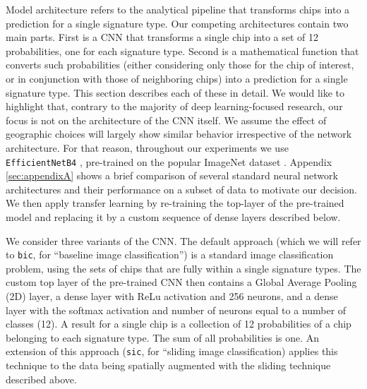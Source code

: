 Model architecture refers to the analytical pipeline that transforms chips
into a prediction for a single signature type. Our competing architectures
contain two main parts. First is a CNN that transforms a single chip into a
set of 12 probabilities, one for each signature type.
Second is a mathematical function that converts such probabilities (either
considering only those for the chip of interest, or in conjunction with
those of neighboring chips) into a
prediction for a single signature type. This section describes each of these in detail. 
We would like to highlight that, contrary to the majority of deep
learning-focused research, our focus is not on the architecture of the CNN
itself. We assume the effect of geographic choices will largely show similar
behavior irrespective of the network architecture. For that reason, throughout
our experiments we use \texttt{EfficientNetB4} \citep{https://doi.org/10.48550/arxiv.1905.11946}, pre-trained
on the popular ImageNet dataset \citep{deng2009imagenet}. Appendix \ref*{sec:appendixA} shows a brief comparison of
several standard neural network architectures and their performance on a subset of data
to motivate our decision. We then apply transfer learning by re-training the
top-layer of the pre-trained model and replacing it by a
custom sequence of dense layers described below.

We consider three variants of the CNN.
The default approach (which we will refer to \texttt{bic}, for ``baseline
image classification'') is a standard image classification problem, using the sets of chips
that are fully within a single signature types. The custom top layer of the pre-trained CNN then contains a Global Average
Pooling (2D) layer, a dense layer with ReLu activation and 256 neurons, and a dense
layer with the softmax activation and number of neurons equal to a number of classes
(12). A result for a single chip is a collection of 12 probabilities
of a chip belonging to each signature type. The sum of all probabilities is
one.
An extension of this approach (\texttt{sic}, for ``sliding image
classification) applies this technique to the data being spatially augmented
with the sliding technique described above.


